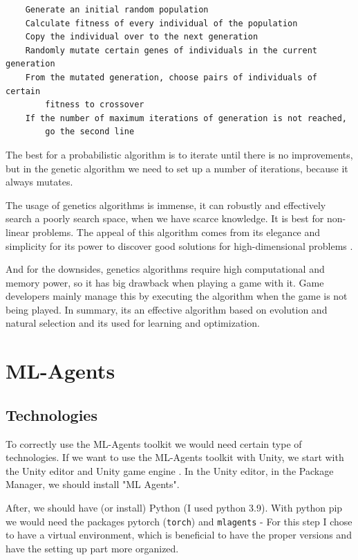 \documentclass[a4paper, 12pt]{book}
\begin{document}
\begin{verbatim}
    Generate an initial random population
    Calculate fitness of every individual of the population
    Copy the individual over to the next generation
    Randomly mutate certain genes of individuals in the current generation
    From the mutated generation, choose pairs of individuals of certain 
        fitness to crossover
    If the number of maximum iterations of generation is not reached, 
        go the second line
\end{verbatim}

The best for a probabilistic algorithm is to iterate until there is no improvements, but in the genetic algorithm we need to set up a number of iterations, because it always mutates.

The usage of genetics algorithms is immense, it can robustly and effectively search a poorly search space, when we have scarce knowledge. It is best for non-linear problems. The appeal of this algorithm comes from its elegance and simplicity for its power to discover good solutions for high-dimensional problems \cite{CurrentAIGames}.

And for the downsides, genetics algorithms require high computational and memory power, so it has big drawback when playing a game with it. Game developers mainly manage this by executing the algorithm when the game is not being played. In summary, its an effective algorithm based on evolution and natural selection and its used for learning and optimization.

\chapter{ML-Agents}
\label{ch3}

\section{Technologies}

To correctly use the ML-Agents toolkit we would need certain type of technologies. If we want to use the ML-Agents toolkit with Unity, we start with the Unity editor and Unity game engine \cite{UnitySoftware}. In the Unity editor, in the Package Manager, we should install "ML Agents".

After, we should have (or install) Python \cite{PythonManual} (I used python 3.9). With python pip we would need the packages pytorch (\texttt{torch}) and \texttt{mlagents} - For this step I chose to have a virtual environment, which is beneficial to have the proper versions and have the setting up part more organized.
\end{document}
